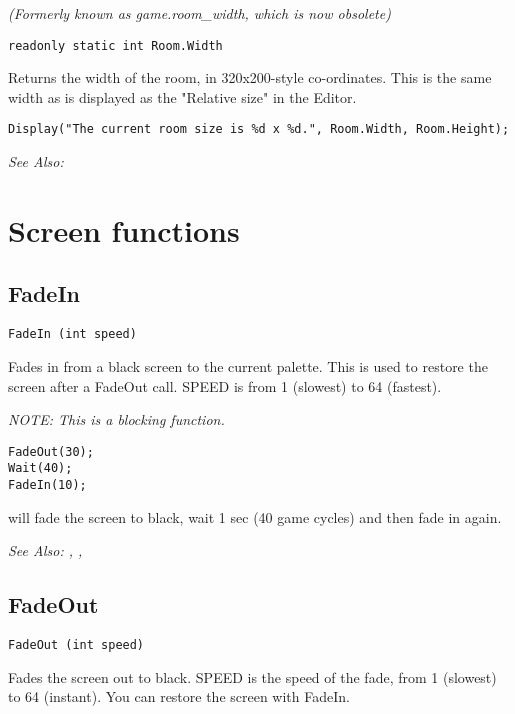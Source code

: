 \it{(Formerly known as game.room_width, which is now obsolete)}

\begin{verbatim}
readonly static int Room.Width
\end{verbatim}
Returns the width of the room, in 320x200-style co-ordinates. This is
the same width as is displayed as the "Relative size" in the Editor.

\begin{verbatim}
Display("The current room size is %d x %d.", Room.Width, Room.Height);
\end{verbatim}

\it{See Also:} 



\section{Screen functions}%


\subsection{FadeIn}\label{FadeIn}%

\begin{verbatim}
FadeIn (int speed)
\end{verbatim}
Fades in from a black screen to the current palette. This is used to restore
the screen after a FadeOut call. SPEED is from 1 (slowest) to 64 (fastest).

\it{NOTE: This is a blocking function.}

\begin{verbatim}
FadeOut(30);
Wait(40);
FadeIn(10);
\end{verbatim}
will fade the screen to black, wait 1 sec (40 game cycles) and then fade in again.

\it{See Also:} , ,


\subsection{FadeOut}\label{FadeOut}%

\begin{verbatim}
FadeOut (int speed)
\end{verbatim}
Fades the screen out to black. SPEED is the speed of the fade, from 1
(slowest) to 64 (instant). You can restore the screen with FadeIn.

